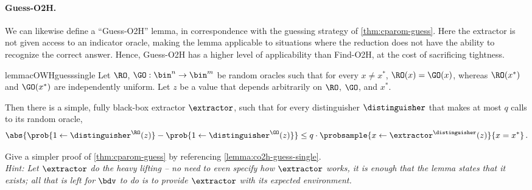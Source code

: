   \paragraph{Guess-O2H.}
    We can likewise define a ``Guess-O2H'' lemma, in correspondence with the guessing
      strategy of \cref{thm:cparom-guess}. Here the extractor is not given
      access to an indicator oracle, making the lemma applicable to situations
      where the reduction does not have the ability to recognize the correct
      answer. Hence, Guess-O2H has a higher level of applicability than Find-O2H, at the
      cost of sacrificing tightness.

    \begin{restatable}{lemma}{cOWHguesssingle}\label{lemma:co2h-guess-single}
      Let $\RO$, $\GO: \bin^n \to \bin^m$ be random
      oracles such that for every $x \neq x^*$, $\RO(x) = \GO(x)$, whereas
      $\RO(x^*)$ and $\GO(x^*)$ are independently uniform. 
      Let $z$ be a value that depends arbitrarily on $\RO$, $\GO$, and $x^*$.

      Then there is a simple, fully black-box extractor $\extractor$,
      such that for every distinguisher $\distinguisher$ that makes at most $q$
      calls to its random oracle,
      \[
          \abs{\prob{1 \gets \distinguisher^{\RO}(z)}
              - \prob{1 \gets \distinguisher^{\GO}(z)}}
            \leq q \cdot \probsample{x \gets \extractor^{\distinguisher}(z)}{x = x^*}\, .
      \]
    \end{restatable}

    \begin{exercise}\label{ex:cparom-lossy}
      Give a simpler proof of \cref{thm:cparom-guess} by
      referencing \cref{lemma:co2h-guess-single}. \\
      \emph{
        Hint: Let $\extractor$ do the heavy lifting -- no need to even specify
        how $\extractor$ works, it is enough that the lemma states that it exists; 
        all that is left for $\bdv$ to do is to provide $\extractor$ with its
        expected environment.
      }
    \end{exercise}

